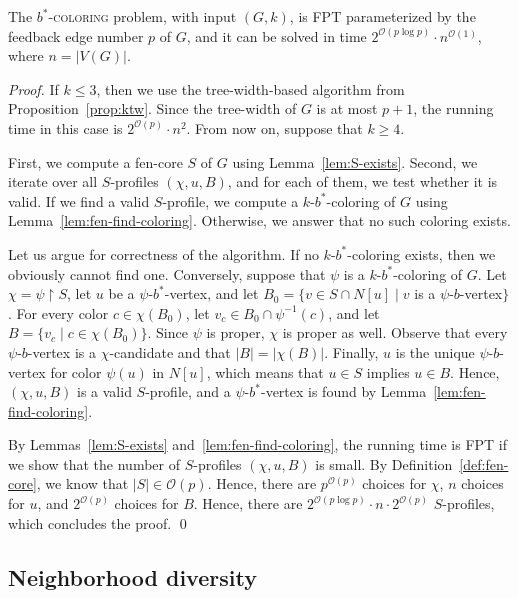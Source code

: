 \documentclass[runningheads, envcountsame]{llncs}
\newcommand{\sep}{\;|\;}
\newcommand{\ca}{\mathcal}
\newcommand{\FPT}{\textsf{FPT}\xspace}
\newcommand{\bscoloring}{$b^*$-\textsc{coloring}\xspace}
\begin{document}
\begin{theorem}
The \bscoloring problem, with input $(G, k)$, is \FPT parameterized by the feedback edge number $p$ of $G$, and it can be solved in time $2^{\ca O(p \log p)} \cdot n^{\ca O(1)}$, where $n= |V(G)|$.
\end{theorem}
\begin{proof}
If $k \le 3$, then we use the tree-width-based algorithm from Proposition~\ref{prop:ktw}.
Since the tree-width of $G$ is at most $p+1$, the running time in this case is $2^{\ca O(p)} \cdot n^2$.
From now on, suppose that $k \ge 4$.

First, we compute a fen-core $S$ of $G$ using Lemma~\ref{lem:S-exists}.
Second, we iterate over all $S$-profiles $(\chi, u, B)$, and for each of them, we test whether it is valid.
If we find a valid $S$-profile, we compute a $k$-$b^*$-coloring of $G$ using Lemma~\ref{lem:fen-find-coloring}. Otherwise, we answer that no such coloring exists.

Let us argue for correctness of the algorithm.
If no $k$-$b^*$-coloring exists, then we obviously cannot find one.
Conversely, suppose that $\psi$ is a $k$-$b^*$-coloring of $G$.
Let $\chi = \psi \upharpoonright S$, let $u$ be a $\psi$-$b^*$-vertex, and let $B_0 = \{v \in S \cap N[u]\sep v$ is a $\psi$-$b$-vertex$\}$.
For every color $c \in \chi(B_0)$, let $v_c \in B_0 \cap \psi^{-1}(c)$, and let $B = \{v_c \sep c \in \chi(B_0)\}$.
Since $\psi$ is proper, $\chi$ is proper as well.
Observe that every $\psi$-$b$-vertex is a $\chi$-candidate and that $|B| = |\chi(B)|$.
Finally, $u$ is the unique $\psi$-$b$-vertex for color $\psi(u)$ in $N[u]$, which means that $u \in S$ implies $u \in B$.
Hence, $(\chi,u,B)$ is a valid $S$-profile, and a $\psi$-$b^*$-vertex is found by Lemma~\ref{lem:fen-find-coloring}.

By Lemmas~\ref{lem:S-exists} and~\ref{lem:fen-find-coloring}, the running time is \FPT if we show that the number of $S$-profiles $(\chi, u, B)$ is small.
By Definition~\ref{def:fen-core}, we know that $|S| \in \ca O(p)$.
Hence, there are $p^{\ca O(p)}$ choices for $\chi$, $n$ choices for $u$, and $2^{\ca O(p)}$ choices for $B$.
Hence, there are $2^{\ca O(p \log p)} \cdot n \cdot 2^{\ca O(p)}$ $S$-profiles, which concludes the proof.
\qed\end{proof}


\subsection{Neighborhood diversity}
\end{document}
